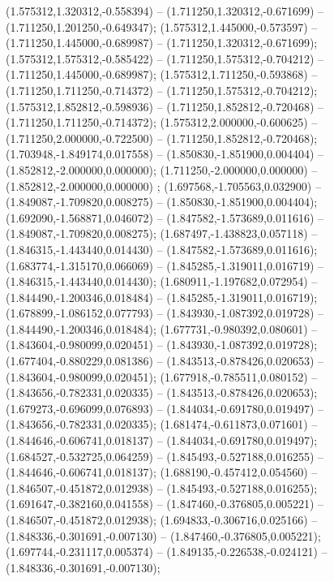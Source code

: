  (1.575312,1.320312,-0.558394) -- (1.711250,1.320312,-0.671699) -- (1.711250,1.201250,-0.649347);
 (1.575312,1.445000,-0.573597) -- (1.711250,1.445000,-0.689987) -- (1.711250,1.320312,-0.671699);
 (1.575312,1.575312,-0.585422) -- (1.711250,1.575312,-0.704212) -- (1.711250,1.445000,-0.689987);
 (1.575312,1.711250,-0.593868) -- (1.711250,1.711250,-0.714372) -- (1.711250,1.575312,-0.704212);
 (1.575312,1.852812,-0.598936) -- (1.711250,1.852812,-0.720468) -- (1.711250,1.711250,-0.714372);
 (1.575312,2.000000,-0.600625) -- (1.711250,2.000000,-0.722500) -- (1.711250,1.852812,-0.720468);
 (1.703948,-1.849174,0.017558) -- (1.850830,-1.851900,0.004404) -- (1.852812,-2.000000,0.000000);
 (1.711250,-2.000000,0.000000) -- (1.852812,-2.000000,0.000000) ;
 (1.697568,-1.705563,0.032900) -- (1.849087,-1.709820,0.008275) -- (1.850830,-1.851900,0.004404);
 (1.692090,-1.568871,0.046072) -- (1.847582,-1.573689,0.011616) -- (1.849087,-1.709820,0.008275);
 (1.687497,-1.438823,0.057118) -- (1.846315,-1.443440,0.014430) -- (1.847582,-1.573689,0.011616);
 (1.683774,-1.315170,0.066069) -- (1.845285,-1.319011,0.016719) -- (1.846315,-1.443440,0.014430);
 (1.680911,-1.197682,0.072954) -- (1.844490,-1.200346,0.018484) -- (1.845285,-1.319011,0.016719);
 (1.678899,-1.086152,0.077793) -- (1.843930,-1.087392,0.019728) -- (1.844490,-1.200346,0.018484);
 (1.677731,-0.980392,0.080601) -- (1.843604,-0.980099,0.020451) -- (1.843930,-1.087392,0.019728);
 (1.677404,-0.880229,0.081386) -- (1.843513,-0.878426,0.020653) -- (1.843604,-0.980099,0.020451);
 (1.677918,-0.785511,0.080152) -- (1.843656,-0.782331,0.020335) -- (1.843513,-0.878426,0.020653);
 (1.679273,-0.696099,0.076893) -- (1.844034,-0.691780,0.019497) -- (1.843656,-0.782331,0.020335);
 (1.681474,-0.611873,0.071601) -- (1.844646,-0.606741,0.018137) -- (1.844034,-0.691780,0.019497);
 (1.684527,-0.532725,0.064259) -- (1.845493,-0.527188,0.016255) -- (1.844646,-0.606741,0.018137);
 (1.688190,-0.457412,0.054560) -- (1.846507,-0.451872,0.012938) -- (1.845493,-0.527188,0.016255);
 (1.691647,-0.382160,0.041558) -- (1.847460,-0.376805,0.005221) -- (1.846507,-0.451872,0.012938);
 (1.694833,-0.306716,0.025166) -- (1.848336,-0.301691,-0.007130) -- (1.847460,-0.376805,0.005221);
 (1.697744,-0.231117,0.005374) -- (1.849135,-0.226538,-0.024121) -- (1.848336,-0.301691,-0.007130);
